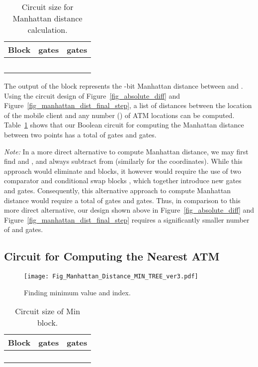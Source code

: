 \documentclass[10pt,journal,cspaper,compsoc]{IEEEtran}
\begin{document}
\begin{table}[!t]
\renewcommand{\arraystretch}{1.3}
\caption{Circuit size for Manhattan distance calculation.}
\label{table_manhattan_dist_calc}
\centering
\begin{tabular}{||c||c||c||}
\hline
\bfseries Block & \bfseries  gates & \bfseries  gates\\
\hline
 &  & \\
\hline
 &  & \\
\hline
 &  & \\
\hline
 &  & \\
\hline
 &  & \\
\hline
\end{tabular}
\end{table}

The output of the  block represents the -bit Manhattan distance between  and . Using the circuit design of Figure~\ref{fig_absolute_diff} and Figure~\ref{fig_manhattan_dist_final_step}, a list of distances between the location of the mobile client and any number () of ATM locations can be computed. Table~\ref{table_manhattan_dist_calc} shows that our Boolean circuit for computing the Manhattan distance between two points has a total of   gates and   gates.


{\em Note:} In a more direct alternative to compute Manhattan distance, we may first find  and , and always subtract  from  (similarly for the  coordinates). While this approach would eliminate  and  blocks, it however would require the use of two comparator and conditional swap blocks \cite{huang2012private}, which together introduce  new  gates and   gates. Consequently, this alternative approach to compute Manhattan distance would require a total of   gates and   gates. Thus, in comparison to this more direct alternative, our design shown above in Figure~\ref{fig_absolute_diff} and Figure~\ref{fig_manhattan_dist_final_step} requires a significantly smaller number of   and   gates.


\subsection{Circuit for Computing the Nearest ATM}

\begin{figure}[t]
\centering
\texttt{[image: Fig\_Manhattan\_Distance\_MIN\_TREE\_ver3.pdf]}
\caption{Finding minimum value and index.}\label{fig_min_tree}
\end{figure}

\begin{table}[!t]
\renewcommand{\arraystretch}{1.3}
\caption{Circuit size of  Min block.}
\label{table_one_min_value_index_block}
\centering
\begin{tabular}{||c||c||c||}
\hline
\bfseries Block & \bfseries  gates & \bfseries  gates\\
\hline
 &  & \\
\hline
 &  & \\
\hline
 &  & \\
\hline
 &  & \\
\hline
\end{tabular}
\end{table}
\end{document}
